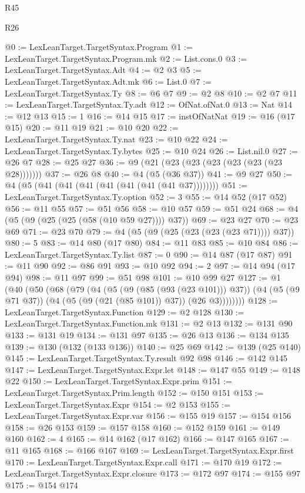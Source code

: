 \begin{lexlean}{R45}
\begin{lexlean}{R26}
\begin{coremodule}
{{{{{{{{{{{{{{{{{{{{{{{{{{{{{{{{{{{{{{{{{{{{{{{{{{{{{{{{{{{{{{{{{{{{{{{{@0 := LexLeanTarget.TargetSyntax.Program
@1 := LexLeanTarget.TargetSyntax.Program.mk
@2 := List.cons.{0}
@3 := LexLeanTarget.TargetSyntax.Adt
@4 := @2 @3
@5 := LexLeanTarget.TargetSyntax.Adt.mk
@6 := List.{0}
@7 := LexLeanTarget.TargetSyntax.Ty
@8 := @6 @7
@9 := @2 @8
@10 := @2 @7
@11 := LexLeanTarget.TargetSyntax.Ty.adt
@12 := OfNat.ofNat.{0}
@13 := Nat
@14 := @12 @13
@15 := 1
@16 := @14 @15
@17 := instOfNatNat
@19 := @16 (@17 @15)
@20 := @11 @19
@21 := @10 @20
@22 := LexLeanTarget.TargetSyntax.Ty.nat
@23 := @10 @22
@24 := LexLeanTarget.TargetSyntax.Ty.bytes
@25 := @10 @24
@26 := List.nil.{0}
@27 := @26 @7
@28 := @25 @27
@36 := @9 (@21 (@23 (@23 (@23 (@23 (@23 (@23 @28)))))))
@37 := @26 @8
@40 := @4 (@5 (@36 @37))
@41 := @9 @27
@50 := @4 (@5 (@41 (@41 (@41 (@41 (@41 (@41 (@41 @37))))))))
@51 := LexLeanTarget.TargetSyntax.Ty.option
@52 := 3
@55 := @14 @52 (@17 @52)
@56 := @11 @55
@57 := @51 @56
@58 := @10 @57
@59 := @51 @24
@68 := @4 (@5 (@9 (@25 (@25 (@58 (@10 @59 @27)))) @37))
@69 := @23 @27
@70 := @23 @69
@71 := @23 @70
@79 := @4 (@5 (@9 (@25 (@23 (@23 (@23 @71)))) @37))
@80 := 5
@83 := @14 @80 (@17 @80)
@84 := @11 @83
@85 := @10 @84
@86 := LexLeanTarget.TargetSyntax.Ty.list
@87 := 0
@90 := @14 @87 (@17 @87)
@91 := @11 @90
@92 := @86 @91
@93 := @10 @92
@94 := 2
@97 := @14 @94 (@17 @94)
@98 := @11 @97
@99 := @51 @98
@101 := @10 @99 @27
@127 := @1
    (@40
      (@50
        (@68
          (@79
            (@4
              (@5 (@9 (@85 (@93 (@23 @101))) @37))
              (@4 (@5 (@9 @71 @37)) (@4 (@5 (@9 (@21 (@85 @101)) @37)) (@26 @3))))))))
@128 := LexLeanTarget.TargetSyntax.Function
@129 := @2 @128
@130 := LexLeanTarget.TargetSyntax.Function.mk
@131 := @2 @13
@132 := @131 @90
@133 := @131 @19
@134 := @131 @97
@135 := @26 @13
@136 := @134 @135
@139 := @130 (@132 (@133 @136))
@140 := @25 @69
@142 := @139 (@25 @140)
@145 := LexLeanTarget.TargetSyntax.Ty.result @92 @98
@146 := @142 @145
@147 := LexLeanTarget.TargetSyntax.Expr.let
@148 := @147 @55
@149 := @148 @22
@150 := LexLeanTarget.TargetSyntax.Expr.prim
@151 := LexLeanTarget.TargetSyntax.Prim.length
@152 := @150 @151
@153 := LexLeanTarget.TargetSyntax.Expr
@154 := @2 @153
@155 := LexLeanTarget.TargetSyntax.Expr.var
@156 := @155 @19
@157 := @154 @156
@158 := @26 @153
@159 := @157 @158
@160 := @152 @159
@161 := @149 @160
@162 := 4
@165 := @14 @162 (@17 @162)
@166 := @147 @165
@167 := @11 @165
@168 := @166 @167
@169 := LexLeanTarget.TargetSyntax.Expr.first
@170 := LexLeanTarget.TargetSyntax.Expr.call
@171 := @170 @19
@172 := LexLeanTarget.TargetSyntax.Expr.closure
@173 := @172 @97
@174 := @155 @97
@175 := @154 @174
}}}}}}}}}}}}}}}}}}}}}}}}}}}}}}}}}}}}}}}}}}}}}}}}}}}}}}}}}}}}}}}}}}}}}}}}
\end{coremodule}
\end{lexlean}
\end{lexlean}
